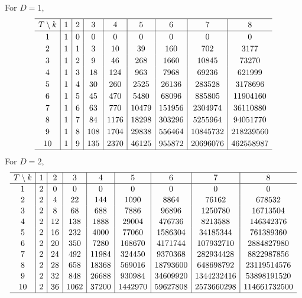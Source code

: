 \documentclass[pdftex]{sigma}
\numberwithin{equation}{section}
\begin{document}
For $D=1$,
\begin{gather*}
\setlength{\tabcolsep}{4.5pt}
\renewcommand{\arraystretch}{1.2}
\begin{tabular}{c|c|c|c|c|c|c|c|c}
\hline $T\setminus k$&1&2&3&4&5&6&7&8\\ \hline
1&1& 0& 0& 0& 0& 0& 0& 0\\
2&1& 1& 3& 10& 39& 160& 702& 3177\\
3&1& 2& 9& 46& 268& 1660& 10845& 73270\\
4&1& 3& 18& 124& 963& 7968& 69236& 621999\\
5&1& 4& 30& 260& 2525& 26136& 283528& 3178696\\
6&1& 5& 45& 470& 5480& 68096& 885805& 11904160\\
7&1& 6& 63& 770& 10479& 151956& 2304974& 36110880\\
8&1& 7& 84& 1176& 18298& 303296& 5255964& 94051770\\
9&1& 8& 108& 1704& 29838& 556464& 10845732& 218239560\\
10&1& 9& 135& 2370& 46125& 955872& 20696076& 462558987\\
\hline
\end{tabular}
\end{gather*}
For $D=2$,
\begin{gather*}
\setlength{\tabcolsep}{4.5pt}
\renewcommand{\arraystretch}{1.1}
\begin{tabular}{c|c|c|c|c|c|c|c|c}
\hline$T\setminus k$&1&2&3&4&5&6&7&8\\ \hline
1&2& 0& 0& 0& 0& 0& 0& 0\\
2&2& 4& 22& 144& 1090& 8864& 76162& 678532\\
3&2& 8& 68& 688& 7886& 96896& 1250780& 16713504\\
4&2& 12& 138& 1888& 29004& 476736& 8213588& 146342376\\
5&2& 16& 232& 4000& 77060& 1586304& 34185344& 761389360\\
6&2& 20& 350& 7280& 168670& 4171744& 107932710& 2884827980\\
7&2& 24& 492& 11984& 324450& 9370368& 282934428& 8822987856\\
8&2& 28& 658& 18368& 569016& 18793600& 648698792& 23119514576\\
9&2& 32& 848& 26688& 930984& 34609920& 1344232416& 53898191520\\
10&2& 36& 1062& 37200& 1442970& 59627808& 2573660298& 114661732500\\
\hline
\end{tabular}
\end{gather*}
\end{document}
